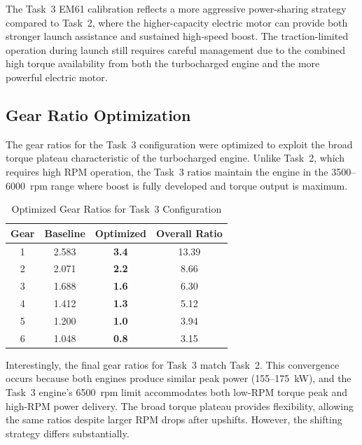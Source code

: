 The Task~3 EM61 calibration reflects a more aggressive power-sharing strategy compared to Task~2, where the higher-capacity electric motor can provide both stronger launch assistance and sustained high-speed boost. The traction-limited operation during launch still requires careful management due to the combined high torque availability from both the turbocharged engine and the more powerful electric motor.

\subsection{Gear Ratio Optimization}

The gear ratios for the Task~3 configuration were optimized to exploit the broad torque plateau characteristic of the turbocharged engine. Unlike Task~2, which requires high RPM operation, the Task~3 ratios maintain the engine in the 3500--6000~rpm range where boost is fully developed and torque output is maximum.

\begin{table}[H]
\centering
\caption{Optimized Gear Ratios for Task~3 Configuration}
\label{tab:task3_gear_ratios}
\small
\begin{tabular}{@{}cccc@{}}
\toprule
\textbf{Gear} & \textbf{Baseline} & \textbf{Optimized} & \textbf{Overall Ratio} \\
\midrule
1 & 2.583 & \textcolor{optimizedcolor}{\textbf{3.4}} & 13.39 \\
2 & 2.071 & \textcolor{optimizedcolor}{\textbf{2.2}} & 8.66 \\
3 & 1.688 & \textcolor{optimizedcolor}{\textbf{1.6}} & 6.30 \\
4 & 1.412 & \textcolor{optimizedcolor}{\textbf{1.3}} & 5.12 \\
5 & 1.200 & \textcolor{optimizedcolor}{\textbf{1.0}} & 3.94 \\
6 & 1.048 & \textcolor{optimizedcolor}{\textbf{0.8}} & 3.15 \\
\bottomrule
\end{tabular}
\end{table}

Interestingly, the final gear ratios for Task~3 match Task~2. This convergence occurs because both engines produce similar peak power (155--175~kW), and the Task~3 engine's 6500~rpm limit accommodates both low-RPM torque peak and high-RPM power delivery. The broad torque plateau provides flexibility, allowing the same ratios despite larger RPM drops after upshifts. However, the shifting strategy differs substantially.


